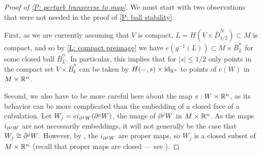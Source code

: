 \begin{proof}[Proof of \cref{P: perturb transverse to map}]
We must start with two observations that were not needed in the proof of \cref{P: ball stability}.

First, as we are currently assuming that $V$ is compact, $L=H(V\times \bar D^N_{1/2})\subset M$ is compact, and so by \cref{L: compact preimage} we have $e(g^{-1}(L))\subset M\times \bar B^n_L$ for some closed ball $\bar B^n_L$. In particular, this implies that for $|s|\leq 1/2$ only points in the compact set $V\times \bar B^n_k$ can be taken by $H(-,s)\times \mathrm{id}_{\mathbb{R}^n}$ to points of $e(W)$ in $M\times \mathbb{R}^n$.

Second, we also have to be more careful here about the map $e:W\times \mathbb{R}^n$, as its behavior can be more complicated than the embedding of a closed face of a cubulation.
Let $W_j=ei_{\partial^jW}(\partial^jW)$, the image of $\partial^jW$ in $M\times \mathbb{R}^n$. As the maps $i_{\partial^jW}$ are not necessarily embeddings, it will not generally be the case that $W_j\cong \partial^jW$. However, by \cite[Lemma 2.8]{Joy12}, the $i_{\partial^jW}$ are proper maps, so $W_j$ is a closed subset of $M\times \mathbb{R}^n$ (recall that proper maps are closed --- see \cite[Section I.10]{Bou98}).


\end{proof}
